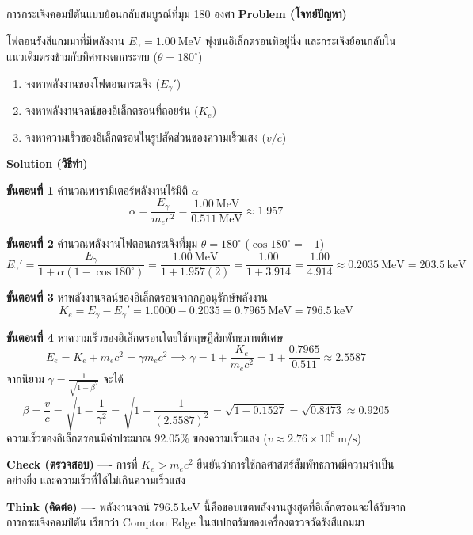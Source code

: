 \begin{psctbox}{การกระเจิงคอมป์ตันแบบย้อนกลับสมบูรณ์ที่มุม 180 องศา}
\textbf{Problem (โจทย์ปัญหา)}

โฟตอนรังสีแกมมาที่มีพลังงาน $E_\gamma = 1.00~\text{MeV}$ พุ่งชนอิเล็กตรอนที่อยู่นิ่ง และกระเจิงย้อนกลับในแนวเดิมตรงข้ามกับทิศทางตกกระทบ ($\theta = 180^\circ$)
\begin{enumerate}
    \item จงหาพลังงานของโฟตอนกระเจิง ($E_\gamma'$)
    \item จงหาพลังงานจลน์ของอิเล็กตรอนที่ถอยร่น ($K_e$)
    \item จงหาความเร็วของอิเล็กตรอนในรูปสัดส่วนของความเร็วแสง ($v/c$)
\end{enumerate}

\textbf{Solution (วิธีทำ)}

\textbf{ขั้นตอนที่ 1} คำนวณพารามิเตอร์พลังงานไร้มิติ $\alpha$
\begin{equation*}
\alpha = \frac{E_\gamma}{m_e c^2} = \frac{1.00~\text{MeV}}{0.511~\text{MeV}} \approx 1.957
\end{equation*}

\textbf{ขั้นตอนที่ 2} คำนวณพลังงานโฟตอนกระเจิงที่มุม $\theta = 180^\circ$ ($\cos 180^\circ = -1$)
\begin{equation*}
E_\gamma' = \frac{E_\gamma}{1 + \alpha(1 - \cos 180^\circ)} = \frac{1.00~\text{MeV}}{1 + 1.957(2)} = \frac{1.00}{1 + 3.914} = \frac{1.00}{4.914} \approx 0.2035~\text{MeV} = 203.5~\text{keV}
\end{equation*}

\textbf{ขั้นตอนที่ 3} หาพลังงานจลน์ของอิเล็กตรอนจากกฎอนุรักษ์พลังงาน
\begin{equation*}
K_e = E_\gamma - E_\gamma' = 1.0000 - 0.2035 = 0.7965~\text{MeV} = 796.5~\text{keV}
\end{equation*}

\textbf{ขั้นตอนที่ 4} หาความเร็วของอิเล็กตรอนโดยใช้ทฤษฎีสัมพัทธภาพพิเศษ
\begin{equation*}
E_e = K_e + m_e c^2 = \gamma m_e c^2 \implies \gamma = 1 + \frac{K_e}{m_e c^2} = 1 + \frac{0.7965}{0.511} \approx 2.5587
\end{equation*}
จากนิยาม $\gamma = \frac{1}{\sqrt{1 - \beta^2}}$ จะได้
\begin{equation*}
\beta = \frac{v}{c} = \sqrt{1 - \frac{1}{\gamma^2}} = \sqrt{1 - \frac{1}{(2.5587)^2}} = \sqrt{1 - 0.1527} = \sqrt{0.8473} \approx 0.9205
\end{equation*}
ความเร็วของอิเล็กตรอนมีค่าประมาณ $92.05\%$ ของความเร็วแสง ($v \approx 2.76 \times 10^8~\text{m/s}$)

\textbf{Check (ตรวจสอบ)} ---- การที่ $K_e > m_e c^2$ ยืนยันว่าการใช้กลศาสตร์สัมพัทธภาพมีความจำเป็นอย่างยิ่ง และความเร็วที่ได้ไม่เกินความเร็วแสง

\textbf{Think (คิดต่อ)} ---- พลังงานจลน์ $796.5~\text{keV}$ นี้คือขอบเขตพลังงานสูงสุดที่อิเล็กตรอนจะได้รับจากการกระเจิงคอมป์ตัน เรียกว่า Compton Edge ในสเปกตรัมของเครื่องตรวจวัดรังสีแกมมา
\end{psctbox}

